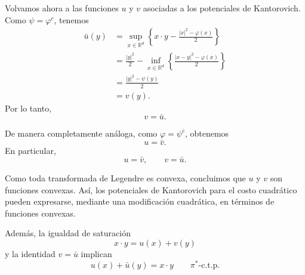 \documentclass[12pt, a4paper]{amsbook}
\theoremstyle{remark}
\theoremstyle{definition}
\numberwithin{section}{chapter}
\numberwithin{subsection}{section}
\numberwithin{equation}{section}
\numberwithin{figure}{chapter}
\begin{document}
Volvamos ahora a las funciones $u$ y $v$ asociadas a los potenciales de
Kantorovich. Como $\psi=\varphi^c$, tenemos
\[
\begin{aligned}
\bar u(y)
&=
\sup_{x\in\mathbb R^d}
\left\{
x\cdot y-\frac{|x|^2-\varphi(x)}{2}
\right\}\\
&=
\frac{|y|^2}{2}
-
\inf_{x\in\mathbb R^d}
\left\{
\frac{|x-y|^2-\varphi(x)}{2}
\right\}\\
&=
\frac{|y|^2-\psi(y)}{2}\\
&=v(y).
\end{aligned}
\]
Por lo tanto,
\[
v=\bar u.
\]

De manera completamente análoga, como $\varphi=\psi^{\bar c}$, obtenemos
\[
u=\bar v.
\]
En particular,
\[
u=\bar v,
\qquad
v=\bar u.
\]

Como toda transformada de Legendre es convexa, concluimos que $u$ y $v$
son funciones convexas. Así, los potenciales de Kantorovich para el costo
cuadrático pueden expresarse, mediante una modificación cuadrática, en
términos de funciones convexas.

Además, la igualdad de saturación
\[
x\cdot y=u(x)+v(y)
\]
y la identidad $v=\bar u$ implican
\[
u(x)+\bar u(y)=x\cdot y
\qquad \pi^*\text{-c.t.p.}
\]
\end{document}
